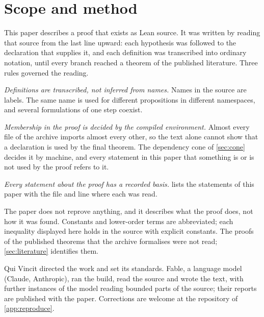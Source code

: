 \section{Scope and method}\label{sec:method}

This paper describes a proof that exists as Lean source. It was written by reading that source
from the last line upward: each hypothesis was followed to the declaration that supplies it,
and each definition was transcribed into ordinary notation, until every branch reached a
theorem of the published literature. Three rules governed the reading.

\emph{Definitions are transcribed, not inferred from names.} Names in the source are labels.
The same name is used for different propositions in different namespaces, and several
formulations of one step coexist.

\emph{Membership in the proof is decided by the compiled environment.} Almost every file of the
archive imports almost every other, so the text alone cannot show that a declaration is used by
the final theorem. The dependency cone of \cref{sec:cone} decides it by machine, and every
statement in this paper that something is or is not used by the proof refers to it.

\emph{Every statement about the proof has a recorded basis.}  lists the
statements of this paper with the file and line where each was read.

The paper does not reprove anything, and it describes what the proof does, not how it was
found. Constants and lower-order terms are abbreviated; each inequality displayed here holds in
the source with explicit constants. The proofs of the published theorems that the archive
formalises were not read; \cref{sec:literature} identifies them.

Qui Vincit directed the work and set its standards. Fable, a language model (Claude,
Anthropic), ran the build, read the source and wrote the text, with further instances of the
model reading bounded parts of the source; their reports are published with the paper.
Corrections are welcome at the repository of \cref{app:reproduce}.
